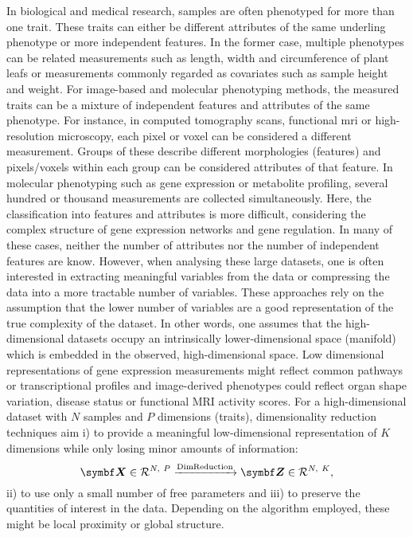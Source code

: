 In biological and medical research, samples are often phenotyped for more than one trait. These traits can either be different attributes of the same underling phenotype or more independent features. In the former case, multiple phenotypes can be related measurements such as length, width and circumference of plant leafs or measurements commonly regarded as covariates such as sample height and weight. For image-based and molecular phenotyping methods, the measured traits can be a mixture of independent features and attributes of the same phenotype. 
For instance, in computed tomography scans, functional \gls{mri} or high-resolution microscopy, each pixel or voxel can be considered a different measurement. Groups of these describe different morphologies (features) and pixels/voxels within each group can be considered attributes of that feature. In molecular phenotyping such as gene expression or metabolite profiling, several hundred or thousand measurements are collected simultaneously. Here, the classification into features and attributes is more difficult, considering the complex structure of gene expression networks and gene regulation. In many of these cases, neither the number of attributes nor the number of independent features are know. However, when analysing these large datasets, one is often interested in extracting meaningful variables from the data or compressing the data into a more tractable number of variables. These approaches rely on the assumption that the lower number of variables are a good representation of the true complexity of the dataset. In other words, one assumes that the high-dimensional datasets occupy an intrinsically lower-dimensional space (manifold) which is embedded in the observed, high-dimensional space. Low dimensional representations of gene expression measurements might reflect common pathways or transcriptional profiles and image-derived phenotypes could reflect organ shape variation, disease status or functional MRI activity scores.  For a high-dimensional dataset  with \(N\) samples and \(P\) dimensions (traits), dimensionality reduction techniques aim i) to provide a meaningful low-dimensional representation  of \(K\) dimensions while only losing minor amounts of information:
\begin{equation}
\mat{X} \inR N P \xrightarrow{\text{DimReduction}} \mat{Z} \inR N K ,
\end{equation}
ii) to use only a small number of free parameters and iii) to preserve the quantities of interest in the data. Depending on the algorithm employed, these might be local proximity or global structure. 

